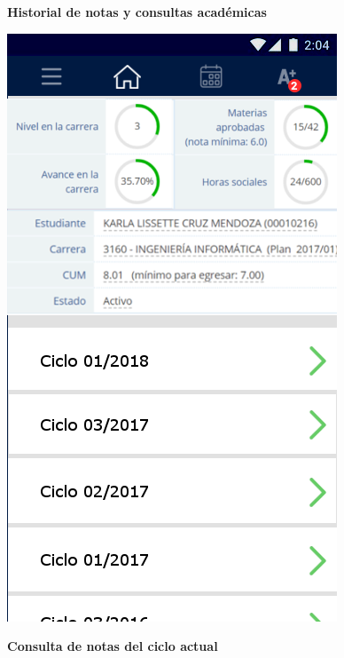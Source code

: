 \documentclass[12pt]{article}
\begin{document}
\begin{figure}[!tbp]
	\centering
	\begin{minipage}[b]{0.45\textwidth}
		\caption{\textbf{Historial de notas y consultas académicas}}
		\label{fig:consultaNotas2}
		\includegraphics[width=\textwidth]{img/8.png}
	\end{minipage}
	\hfill
	\begin{minipage}[b]{0.45\textwidth}
		\caption{\textbf{Consulta de notas del ciclo actual}}
		\label{fig:consultaNotas}

\end{minipage}
\end{figure}
\end{document}
